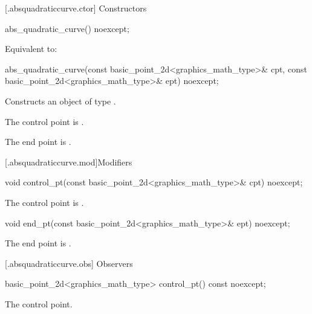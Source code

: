  [\iotwod.absquadraticcurve.ctor] {Constructors}%

%
\begin{itemdecl}
abs_quadratic_curve() noexcept;
\end{itemdecl}
\begin{itemdescr}
\pnum
\effects Equivalent to: 
\end{itemdescr}

%
\begin{itemdecl}
abs_quadratic_curve(const basic_point_2d<graphics_math_type>& cpt,
  const basic_point_2d<graphics_math_type>& ept) noexcept;
\end{itemdecl}
\begin{itemdescr}
\pnum
\effects Constructs an object of type .

\pnum
\remarks The control point is .

\pnum
\remarks The end point is .
\end{itemdescr}

 [\iotwod.absquadraticcurve.mod]{Modifiers}%

%
\begin{itemdecl}
void control_pt(const basic_point_2d<graphics_math_type>& cpt) noexcept;
\end{itemdecl}
\begin{itemdescr}
\pnum
\effects The control point is .
\end{itemdescr}

%
\begin{itemdecl}
void end_pt(const basic_point_2d<graphics_math_type>& ept) noexcept;
\end{itemdecl}
\begin{itemdescr}
\pnum
\effects The end point is .
\end{itemdescr}

 [\iotwod.absquadraticcurve.obs] {Observers}

%
\begin{itemdecl}
basic_point_2d<graphics_math_type> control_pt() const noexcept;
\end{itemdecl}
\begin{itemdescr}
\pnum
\returns The control point.
\end{itemdescr}

